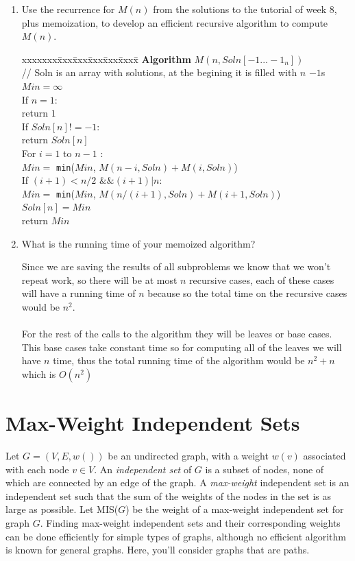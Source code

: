 \documentclass[11pt]{article}
\def\question#1{\red{#1}}
\def\soln#1{\par\blu{#1}} %
\def\blu#1{{\color{blu}#1}}
\def\red#1{{\color{red}#1}}
\begin{document}
\begin{enumerate}
\item \question{Use the recurrence for $M(n)$ from the solutions to the tutorial of week 8, plus memoization, to develop an efficient recursive algorithm to compute $M(n)$.}
\soln{
  \begin{tabbing}
  xxxxxxx\=xxx\=xxx\=xxx\=xxx\=xxxx\= \kill
  \> {\bf Algorithm} $M(n, Soln[-1...-1_n])$ \\
  \>\> // Soln is an array with solutions, at the begining it is filled with $n$ $-1$s \\
  \>\> $Min = \infty$ \\
  \>\> If $n = 1 :$ \\
  \>\>\> return $1$ \\
  \>\> If $Soln[n] != -1 :$ \\
  \>\>\> return $Soln[n]$ \\
  \>\> For $i = 1$ to $n-1$ $:$ \\
  \>\>\> $Min = $ \texttt{min}($Min$, $M(n-i,Soln)+M(i,Soln)$) \\
  \>\>\> If $(i+1) < n/2 \text{ \&\& } (i+1)|n : $ \\
  \>\>\>\> $Min = $ \texttt{min}($Min$, $M(n/(i+1),Soln)+M(i+1,Soln)$) \\
  \>\> $Soln[n] = Min$ \\
  \>\> return $Min$ \\
  \end{tabbing}
}

\item \question{What is the running time of your memoized algorithm?}
\soln{
  Since we are saving the results of all subproblems we know that we won't repeat work, so there will 
  be at most $n$ recursive cases, each of these cases will have a running time of $n$ because so the 
  total time on the recursive cases would be $n^2$. \\  \\
  For the rest of the calls to the algorithm they will be leaves or base cases. This base cases 
  take constant time so for computing all of the leaves we will have $n$ time, thus the total running 
  time of the algorithm would be $n^2 + n$ which is $O(n^2)$
}
\end{enumerate}

\section{Max-Weight Independent Sets}
\label{sec-4}
Let $G=(V,E,w())$ be an undirected graph, with a weight $w(v)$
associated with each node $v\in V$.  An \emph{independent set} of $G$ is a
subset of nodes, none of which are connected by an edge of the
graph. A \emph{max-weight} independent set is an
independent set such that the sum of the weights of the nodes in the
set is as large as possible. 
Let MIS($G$) be the weight of a max-weight independent set for graph $G$.
Finding max-weight independent sets and their corresponding weights
can be done efficiently for simple types of graphs, although no efficient
algorithm is known for general graphs. Here, you'll consider graphs
that are paths.
\end{document}
